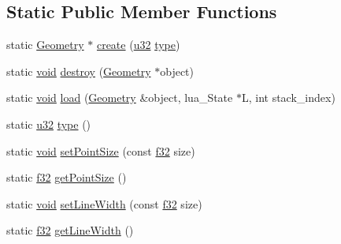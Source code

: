 \subsection*{Static Public Member Functions}
\begin{DoxyCompactItemize}
\item 
static \mbox{\hyperlink{classnjli_1_1_geometry}{Geometry}} $\ast$ \mbox{\hyperlink{classnjli_1_1_geometry_a1b2b50024e18bfce206656b91440dfd1}{create}} (\mbox{\hyperlink{_util_8h_a10e94b422ef0c20dcdec20d31a1f5049}{u32}} \mbox{\hyperlink{classnjli_1_1_geometry_a144e779681b19041b60e129cbf7cac29}{type}})
\item 
static \mbox{\hyperlink{_thread_8h_af1e856da2e658414cb2456cb6f7ebc66}{void}} \mbox{\hyperlink{classnjli_1_1_geometry_a349dae2018bfdf9bcbec73623d45ce68}{destroy}} (\mbox{\hyperlink{classnjli_1_1_geometry}{Geometry}} $\ast$object)
\item 
static \mbox{\hyperlink{_thread_8h_af1e856da2e658414cb2456cb6f7ebc66}{void}} \mbox{\hyperlink{classnjli_1_1_geometry_a54a7465cbc4c4d1c8c353a809c73393e}{load}} (\mbox{\hyperlink{classnjli_1_1_geometry}{Geometry}} \&object, lua\+\_\+\+State $\ast$L, int stack\+\_\+index)
\item 
static \mbox{\hyperlink{_util_8h_a10e94b422ef0c20dcdec20d31a1f5049}{u32}} \mbox{\hyperlink{classnjli_1_1_geometry_a144e779681b19041b60e129cbf7cac29}{type}} ()
\item 
static \mbox{\hyperlink{_thread_8h_af1e856da2e658414cb2456cb6f7ebc66}{void}} \mbox{\hyperlink{classnjli_1_1_geometry_a73ef5b46355f011df4a64303dd99d7b6}{set\+Point\+Size}} (const \mbox{\hyperlink{_util_8h_a5f6906312a689f27d70e9d086649d3fd}{f32}} size)
\item 
static \mbox{\hyperlink{_util_8h_a5f6906312a689f27d70e9d086649d3fd}{f32}} \mbox{\hyperlink{classnjli_1_1_geometry_a8db5f3cf3727aa03fb31a1954c53c139}{get\+Point\+Size}} ()
\item 
static \mbox{\hyperlink{_thread_8h_af1e856da2e658414cb2456cb6f7ebc66}{void}} \mbox{\hyperlink{classnjli_1_1_geometry_aca9151002282f1d817893db01d48d332}{set\+Line\+Width}} (const \mbox{\hyperlink{_util_8h_a5f6906312a689f27d70e9d086649d3fd}{f32}} size)
\item 
static \mbox{\hyperlink{_util_8h_a5f6906312a689f27d70e9d086649d3fd}{f32}} \mbox{\hyperlink{classnjli_1_1_geometry_a1c16844fdb0bd887c6338bfb445a1804}{get\+Line\+Width}} ()
\end{DoxyCompactItemize}
